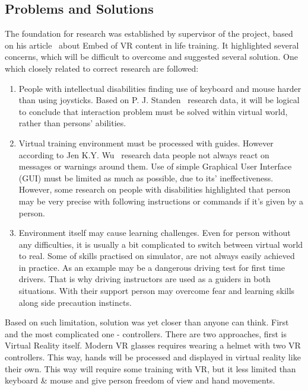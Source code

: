 \documentclass[18pt]{article}
\numberwithin{equation}{section} %
\numberwithin{figure}{section} %
\numberwithin{table}{section} %
\begin{document}
	\subsection{Problems and Solutions}
		The foundation for research was established by supervisor of the project, based on his article~\cite{quteprints100187} about Embed of VR content in life training. It highlighted several concerns, which will be difficult to overcome and suggested several solution. One which closely related to correct research are followed: \\	
		\begin{enumerate}
			\item People with intellectual disabilities finding use of keyboard and mouse harder than using joysticks. Based on P. J. Standen~\cite{control} research data, it will be logical to conclude that interaction problem must be solved within virtual world, rather than persons' abilities.
			\item Virtual training environment must be processed with guides. However according to Jen K.Y. Wu~\cite{WU20058} research data people not always react on messages or warnings around them. Use of simple Graphical User Interface (GUI) must be limited as much as possible, due to its' ineffectiveness. However, some research on people with disabilities highlighted that person may be very precise with following instructions or commands if it's given by a person.
			\item Environment itself may cause learning challenges. Even for person without any difficulties, it is usually a bit complicated to switch between virtual world to real. Some of skills practised on simulator, are not always easily achieved in practice. As an example may be a dangerous driving test for first time drivers. That is why driving instructors are used as a guiders in both situations. With their support person may overcome fear and learning skills along side precaution instincts.
		\end{enumerate}
		Based on such limitation, solution was yet closer than anyone can think. First and the most complicated one - controllers. There are two approaches, first is Virtual Reality itself. Modern VR glasses requires wearing a helmet with two VR controllers. This way, hands will be processed and displayed in virtual reality like their own. This way will require some training with VR, but it less limited than keyboard \& mouse and give person freedom of view and hand movements. \\
		
\end{document}
